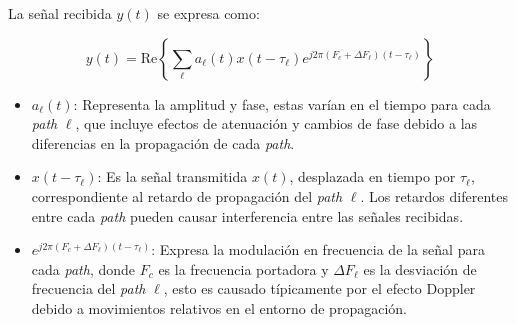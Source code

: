 \documentclass[
  11pt,
  letterpaper,
  answers
]{exam}
\begin{document}
\vspace{0.5cm}
\noindent
\vspace{.85cm}
\begin{questions}
    
\begin{solution}

La señal recibida \( y(t) \) se expresa como:

\[
y(t) = \text{Re} \left\{ \sum_{\ell} a_{\ell}(t) x(t - \tau_{\ell}) e^{j2\pi (F_c + \Delta F_{\ell})(t - \tau_{\ell})} \right\}
\]

\begin{itemize}
    \item \textbf{\( a_{\ell}(t) \)}: Representa la amplitud y fase, estas varían en el tiempo para cada \textit{path} \( \ell \), que incluye efectos de atenuación y cambios de fase debido a las diferencias en la propagación de cada \textit{path}.
    
    \item \textbf{\( x(t - \tau_{\ell}) \)}: Es la señal transmitida \( x(t) \), desplazada en tiempo por \( \tau_{\ell} \), correspondiente al retardo de propagación del \textit{path} \( \ell \). Los retardos diferentes entre cada \textit{path} pueden causar interferencia entre las señales recibidas.
    
    \item \textbf{\( e^{j2\pi (F_c + \Delta F_{\ell})(t - \tau_{\ell})} \)}: Expresa la modulación en frecuencia de la señal para cada \textit{path}, donde \( F_c \) es la frecuencia portadora y \( \Delta F_{\ell} \) es la desviación de frecuencia del \textit{path} \( \ell \), esto es causado típicamente por el efecto Doppler debido a movimientos relativos en el entorno de propagación.
\end{itemize}


\end{solution}
\end{questions}
\end{document}
